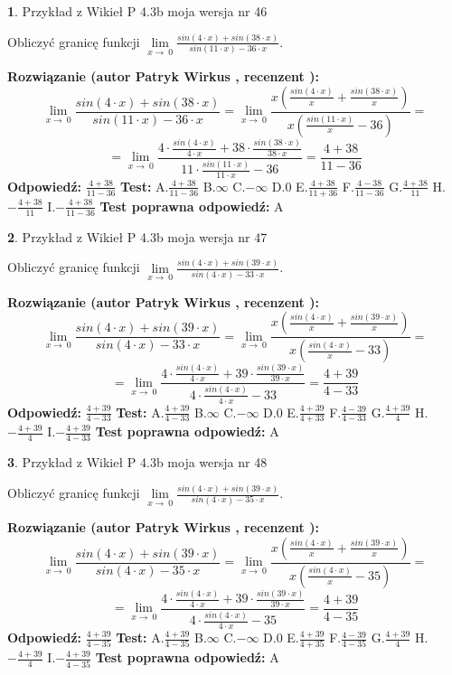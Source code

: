 \documentclass[12pt, a4paper]{article}
\theoremstyle{definition} %
\newtheorem{zad}{}
\newcommand{\zadStart}[1]{\begin{zad}#1\newline}
\newcommand{\zadStop}{\end{zad}}
\newcommand{\rozwStart}[2]{\noindent \textbf{Rozwiązanie (autor #1 , recenzent #2): }\newline}
\newcommand{\rozwStop}{\newline}
\newcommand{\odpStart}{\noindent \textbf{Odpowiedź:}\newline}
\newcommand{\odpStop}{\newline}
\newcommand{\testStart}{\noindent \textbf{Test:}\newline}
\newcommand{\testStop}{\newline}
\newcommand{\kluczStart}{\noindent \textbf{Test poprawna odpowiedź:}\newline}
\newcommand{\kluczStop}{\newline}
\begin{document}
\zadStart{Przykład z Wikieł P 4.3b moja wersja nr 46}


Obliczyć granicę funkcji $\lim\limits_{x\to\ 0}\frac{sin(4 \cdot x)+sin(38 \cdot x)}{sin(11 \cdot x)-36 \cdot x}$.
\zadStop
\rozwStart{Patryk Wirkus}{}
$$\lim\limits_{x\to\ 0}\frac{sin(4 \cdot x)+sin(38 \cdot x)}{sin(11 \cdot x)-36 \cdot x}=\lim\limits_{x\to\ 0}\frac{x(\frac{sin(4 \cdot x)}{x}+\frac{sin(38 \cdot x)}{x})}{x(\frac{sin(11 \cdot x)}{x}-36)}=$$
$$=\lim\limits_{x\to\ 0}\frac{4 \cdot \frac{sin(4 \cdot x)}{4 \cdot x}+38 \cdot \frac{sin(38 \cdot x)}{38 \cdot x}}{11 \cdot \frac{sin(11 \cdot x)}{11 \cdot x}-36}=\frac{4+38}{11-36}$$
\rozwStop
\odpStart
$\frac{4+38}{11-36}$
\odpStop
\testStart
A.$\frac{4+38}{11-36}$
B.$\infty$
C.$-\infty$
D.$0$
E.$\frac{4+38}{11+36}$
F.$\frac{4-38}{11-36}$
G.$\frac{4+38}{11}$
H.$-\frac{4+38}{11}$
I.$-\frac{4+38}{11-36}$
\testStop
\kluczStart
A
\kluczStop



\zadStart{Przykład z Wikieł P 4.3b moja wersja nr 47}


Obliczyć granicę funkcji $\lim\limits_{x\to\ 0}\frac{sin(4 \cdot x)+sin(39 \cdot x)}{sin(4 \cdot x)-33 \cdot x}$.
\zadStop
\rozwStart{Patryk Wirkus}{}
$$\lim\limits_{x\to\ 0}\frac{sin(4 \cdot x)+sin(39 \cdot x)}{sin(4 \cdot x)-33 \cdot x}=\lim\limits_{x\to\ 0}\frac{x(\frac{sin(4 \cdot x)}{x}+\frac{sin(39 \cdot x)}{x})}{x(\frac{sin(4 \cdot x)}{x}-33)}=$$
$$=\lim\limits_{x\to\ 0}\frac{4 \cdot \frac{sin(4 \cdot x)}{4 \cdot x}+39 \cdot \frac{sin(39 \cdot x)}{39 \cdot x}}{4 \cdot \frac{sin(4 \cdot x)}{4 \cdot x}-33}=\frac{4+39}{4-33}$$
\rozwStop
\odpStart
$\frac{4+39}{4-33}$
\odpStop
\testStart
A.$\frac{4+39}{4-33}$
B.$\infty$
C.$-\infty$
D.$0$
E.$\frac{4+39}{4+33}$
F.$\frac{4-39}{4-33}$
G.$\frac{4+39}{4}$
H.$-\frac{4+39}{4}$
I.$-\frac{4+39}{4-33}$
\testStop
\kluczStart
A
\kluczStop



\zadStart{Przykład z Wikieł P 4.3b moja wersja nr 48}


Obliczyć granicę funkcji $\lim\limits_{x\to\ 0}\frac{sin(4 \cdot x)+sin(39 \cdot x)}{sin(4 \cdot x)-35 \cdot x}$.
\zadStop
\rozwStart{Patryk Wirkus}{}
$$\lim\limits_{x\to\ 0}\frac{sin(4 \cdot x)+sin(39 \cdot x)}{sin(4 \cdot x)-35 \cdot x}=\lim\limits_{x\to\ 0}\frac{x(\frac{sin(4 \cdot x)}{x}+\frac{sin(39 \cdot x)}{x})}{x(\frac{sin(4 \cdot x)}{x}-35)}=$$
$$=\lim\limits_{x\to\ 0}\frac{4 \cdot \frac{sin(4 \cdot x)}{4 \cdot x}+39 \cdot \frac{sin(39 \cdot x)}{39 \cdot x}}{4 \cdot \frac{sin(4 \cdot x)}{4 \cdot x}-35}=\frac{4+39}{4-35}$$
\rozwStop
\odpStart
$\frac{4+39}{4-35}$
\odpStop
\testStart
A.$\frac{4+39}{4-35}$
B.$\infty$
C.$-\infty$
D.$0$
E.$\frac{4+39}{4+35}$
F.$\frac{4-39}{4-35}$
G.$\frac{4+39}{4}$
H.$-\frac{4+39}{4}$
I.$-\frac{4+39}{4-35}$
\testStop
\kluczStart
A
\kluczStop
\end{document}
